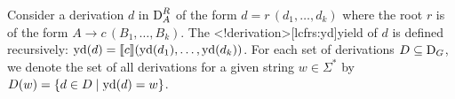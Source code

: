 \documentclass[../../document.tex]{subfiles}
\begin{document}
    \begin{definition}[Yield]
        Consider a derivation \(d\) in \(\operatorname{D}^R_A\) of the form \(d = r\,(d_1, \ldots, d_k)\) where the root \(r\) is of the form \(A \to c\,(B_1, \ldots, B_k)\).
        The <\lcfrs!derivation>[lcfrs:yd]{yield} of \(d\) is defined recursively: \(\operatorname{yd}(d) = \llbracket c\rrbracket(\operatorname{yd}(d_1), \ldots, \operatorname{yd}(d_k))\).
        For each set of derivations \(D \subseteq \operatorname{D}_G\), we denote the set of all derivations for a given string \(w \in \varSigma^*\) by \(D(w) = \{d\in D \mid \operatorname{yd}(d) = w\}\).
    \end{definition}



    \vspace{-\baselineskip}
\end{document}
